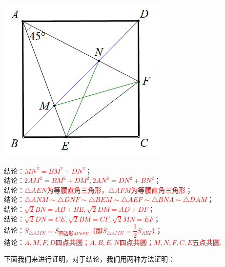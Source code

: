 \documentclass[10pt]{ctexart}
\begin{document}
\vspace{2em}
\begin{minipage}{0.25\textwidth}
	\includegraphics[scale=0.5]{figure/banjiao07.png}
\end{minipage}
\begin{minipage}{0.75\textwidth}
结论：\textcolor{red}{$MN^2=BM^2+DN^2$}；\\
结论：\textcolor{red}{$2AM^2=BM^2+DM^2,2AN^2=DN^2+BN^2$}；\\
结论：\textcolor{red}{$\triangle AEN$为等腰直角三角形，$\triangle AFM$为等腰直角三角形}；\\
结论：\textcolor{red}{$\triangle ANM \sim \triangle DNF \sim \triangle BEM \sim \triangle AEF \sim \triangle BNA \sim \triangle DAM$}；\\
结论：\textcolor{red}{$\sqrt{2}BN=AB+BE,\sqrt{2}DM=AD+DF$}；\\
结论：\textcolor{red}{$\sqrt{2}DN=CE,\sqrt{2}BM=CF,\sqrt{2}MN=EF$}；\\
结论：\textcolor{red}{$S_{\triangle AMN}=S_{\text{四边形}MNFE}$（即$S_{\triangle AMN}=\dfrac{1}{2}S_{AEF}$）}；\\
结论：\textcolor{red}{$A,M,F,D$四点共圆；$A,B,E,N$四点共圆；$M,N,F,C,E$五点共圆}.
\end{minipage}
\vspace{2em}

下面我们来进行证明，对于结论，我们用两种方法证明：
\end{document}
